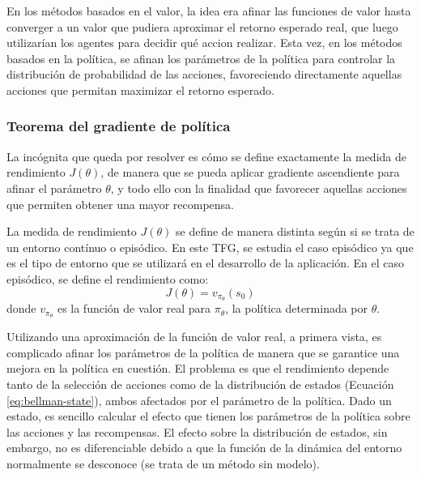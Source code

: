 En los métodos basados en el valor, la idea era afinar las funciones de valor hasta converger a un valor que pudiera aproximar el retorno esperado real, que luego utilizarían los agentes para decidir qué accion realizar. Esta vez, en los métodos basados en la política, se afinan los parámetros de la política para controlar la distribución de probabilidad de las acciones, favoreciendo directamente aquellas acciones que permitan maximizar el retorno esperado.

\subsubsection{Teorema del gradiente de política}

La incógnita que queda por resolver es cómo se define exactamente la medida de rendimiento $J(\theta)$, de manera que se pueda aplicar gradiente ascendiente para afinar el parámetro $\theta$, y todo ello con la finalidad que favorecer aquellas acciones que permiten obtener una mayor recompensa.

La medida de rendimiento $J(\theta)$ se define de manera distinta según si se trata de un entorno contínuo o episódico. En este TFG, se estudia el caso episódico ya que es el tipo de entorno que se utilizará en el desarrollo de la aplicación. En el caso episódico, se define el rendimiento como:
\begin{equation}
    J(\theta) = v_{\pi_\theta}(s_0)
\end{equation}
donde $v_{\pi_\theta}$ es la función de valor real para $\pi_\theta$, la política determinada por $\theta$.

Utilizando una aproximación de la función de valor real, a primera vista, es complicado afinar los parámetros de la política de manera que se garantice una mejora en la política en cuestión. El problema es que el rendimiento depende tanto de la selección de acciones como de la distribución de estados (Ecuación \ref{eq:bellman-state}), ambos afectados por el parámetro de la política. Dado un estado, es sencillo calcular el efecto que tienen los parámetros de la política sobre las acciones y las recompensas. El efecto sobre la distribución de estados, sin embargo, no es diferenciable debido a que la función de la dinámica del entorno normalmente se desconoce (se trata de un método sin modelo).

